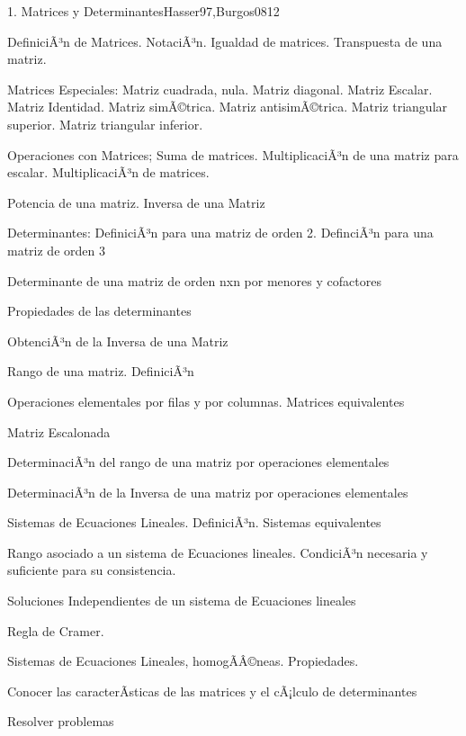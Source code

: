 \begin{syllabus}
\begin{unit}{1. Matrices y Determinantes}{Hasser97,Burgos08}{12}
\begin{topics}
      \item DefiniciÃ³n de Matrices. NotaciÃ³n. Igualdad de matrices. Transpuesta de una matriz.
      \item Matrices Especiales: Matriz cuadrada, nula. Matriz diagonal. Matriz  Escalar. Matriz Identidad. Matriz simÃ©trica. Matriz antisimÃ©trica. Matriz  triangular superior. Matriz triangular inferior.
      \item Operaciones con Matrices; Suma de matrices. MultiplicaciÃ³n de una matriz para escalar. MultiplicaciÃ³n de matrices.
	\item Potencia de una matriz. Inversa de una Matriz
	\item Determinantes: DefiniciÃ³n para una matriz de orden 2. DefinciÃ³n para una matriz de orden 3
	\item Determinante de una matriz de orden nxn por menores y cofactores
	\item Propiedades de las determinantes
	\item ObtenciÃ³n de la Inversa de una Matriz
	\item Rango de una matriz. DefiniciÃ³n
	\item Operaciones elementales por filas y por columnas. Matrices equivalentes
	\item Matriz Escalonada
	\item DeterminaciÃ³n del rango de una matriz por operaciones elementales
	\item DeterminaciÃ³n de la Inversa de una matriz por operaciones elementales
	\item Sistemas de Ecuaciones Lineales. DefiniciÃ³n. Sistemas equivalentes
	\item Rango asociado a un sistema de Ecuaciones lineales. CondiciÃ³n necesaria y suficiente para su consistencia.
	\item Soluciones Independientes de un sistema de Ecuaciones lineales
	\item Regla de Cramer.
	\item Sistemas de Ecuaciones Lineales, homogÃÂ©neas. Propiedades.
   \end{topics}

   \begin{unitgoals}
      \item Conocer las caracterÃ­sticas de las matrices y el cÃ¡lculo de determinantes
	\item Resolver problemas
   \end{unitgoals}
\end{unit}


\end{syllabus}
